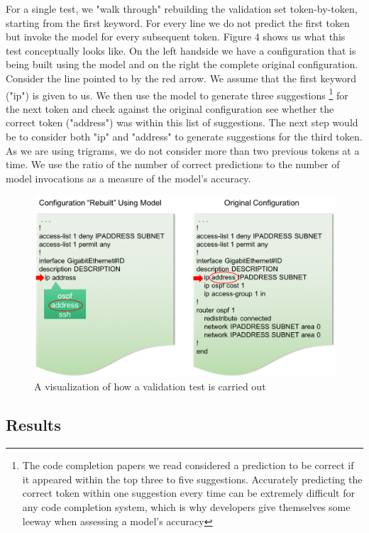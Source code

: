 For a single test, we "walk through" rebuilding the validation set token-by-token, starting from the first keyword. For every line we do not predict the first token but invoke the model for every subsequent token. Figure 4 shows us what this test conceptually looks like. On the left handside we have a configuration that is being built using the model and on the right the complete original configuration. Consider the line pointed to by the red arrow. We assume that the first keyword ("ip") is given to us. We then use the model to generate three suggestions
\footnote{The code completion papers we read considered a prediction to be correct if it appeared within the top three to five suggestions. Accurately predicting the correct token within one suggestion every time can be extremely difficult for any code completion system, which is why developers give themselves some leeway when assessing a model's accuracy}
for the next token and check against the original configuration see whether the correct token ("address") was within this list of suggestions. The next step would be to consider both "ip" and "address" to generate suggestions for the third token. As we are using trigrams, we do not consider more than two previous tokens at a time. We use the ratio of the number of correct predictions to the number of model invocations as a measure of the model's accuracy.\\

\begin{figure}[H]
	\centering
	\includegraphics[width=5in]{validation_example.png}
	\caption{A visualization of how a validation test is carried out}
\end{figure}

\subsection{Results}

